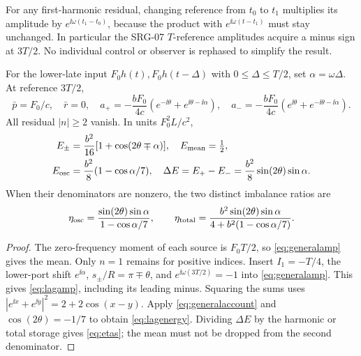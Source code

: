 For any first-harmonic residual, changing reference from $t_0$ to $t_1$ multiplies its amplitude by $e^{\ii\omega(t_1-t_0)}$, because the product with $e^{\ii\omega(t-t_1)}$ must stay unchanged. In particular the SRG-07 $T$-reference amplitudes acquire a minus sign at $3T/2$. No individual control or observer is rephased to simplify the result.

\begin{proposition}\label{prop:lag}
For the lower-late input $F_0h(t),F_0h(t-\Delta)$ with $0\le\Delta\le T/2$, set $\alpha=\omega\Delta$. At reference $3T/2$,
\begin{equation}\label{eq:lagamp}
 \bar p=F_0/c,\quad\bar r=0,\quad
 a_+=-\frac{bF_0}{4c}(e^{-\ii\theta}+e^{\ii\theta-\ii\alpha}),\quad
 a_-=-\frac{bF_0}{4c}(e^{\ii\theta}+e^{-\ii\theta-\ii\alpha}).
\end{equation}
All residual $|n|\ge2$ vanish. In units $F_0^2L/c^2$,
\begin{equation}\label{eq:lagenergy}
 \begin{aligned}
 E_\pm&=\frac{b^2}{16}[1+\cos(2\theta\mp\alpha)],\quad E_{\rm mean}=\tfrac12,\\
 E_{\rm osc}&=\frac{b^2}{8}(1-\cos\alpha/7),\quad
 \Delta E=E_+-E_-=\frac{b^2}{8}\sin(2\theta)\sin\alpha.
 \end{aligned}
\end{equation}
When their denominators are nonzero, the two distinct imbalance ratios are
\begin{equation}\label{eq:etas}
 \eta_{\rm osc}=\frac{\sin(2\theta)\sin\alpha}{1-\cos\alpha/7},\qquad
 \eta_{\rm total}=\frac{b^2\sin(2\theta)\sin\alpha}{4+b^2(1-\cos\alpha/7)}.
\end{equation}
\end{proposition}
\begin{proof}
The zero-frequency moment of each source is $F_0T/2$, so \eqref{eq:generalamp} gives the mean. Only $n=1$ remains for positive indices. Insert $I_1=-T/4$, the lower-port shift $e^{\ii\alpha}$, $s_\pm/R=\pi\mp\theta$, and $e^{\ii\omega(3T/2)}=-1$ into \eqref{eq:generalamp}. This gives \eqref{eq:lagamp}, including its leading minus. Squaring the sums uses $|e^{\ii x}+e^{\ii y}|^2=2+2\cos(x-y)$. Apply \eqref{eq:generalaccount} and $\cos(2\theta)=-1/7$ to obtain \eqref{eq:lagenergy}. Dividing $\Delta E$ by the harmonic or total storage gives \eqref{eq:etas}; the mean must not be dropped from the second denominator.
\end{proof}

